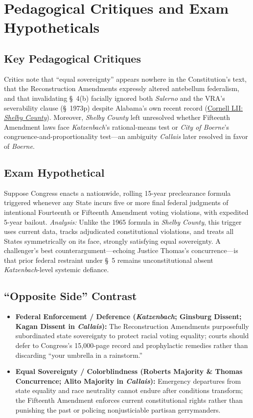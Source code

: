 \documentclass[12pt]{article}
\begin{document}
\section{Pedagogical Critiques and Exam Hypotheticals}

\subsection{Key Pedagogical Critiques}
Critics note that ``equal sovereignty'' appears nowhere in the Constitution's text, that the Reconstruction Amendments expressly altered antebellum federalism, and that invalidating \S~4(b) facially ignored both \emph{Salerno} and the VRA's severability clause (\S~1973p) despite Alabama's own recent record (\href{https://www.law.cornell.edu/supremecourt/text/12-96}{Cornell LII: \emph{Shelby County}}). Moreover, \emph{Shelby County} left unresolved whether Fifteenth Amendment laws face \emph{Katzenbach}'s rational-means test or \emph{City of Boerne}'s congruence-and-proportionality test---an ambiguity \emph{Callais} later resolved in favor of \emph{Boerne}.

\subsection{Exam Hypothetical}
Suppose Congress enacts a nationwide, rolling 15-year preclearance formula triggered whenever any State incurs five or more final federal judgments of intentional Fourteenth or Fifteenth Amendment voting violations, with expedited 5-year bailout. \emph{Analysis:} Unlike the 1965 formula in \emph{Shelby County}, this trigger uses current data, tracks adjudicated constitutional violations, and treats all States symmetrically on its face, strongly satisfying equal sovereignty. A challenger's best counterargument---echoing Justice Thomas's concurrence---is that prior federal restraint under \S~5 remains unconstitutional absent \emph{Katzenbach}-level systemic defiance.

\subsection{``Opposite Side'' Contrast}
\begin{itemize}
    \item \textbf{Federal Enforcement / Deference (\emph{Katzenbach}; Ginsburg Dissent; Kagan Dissent in \emph{Callais}):} The Reconstruction Amendments purposefully subordinated state sovereignty to protect racial voting equality; courts should defer to Congress's 15,000-page record and prophylactic remedies rather than discarding ``your umbrella in a rainstorm.''
    \item \textbf{Equal Sovereignty / Colorblindness (Roberts Majority \& Thomas Concurrence; Alito Majority in \emph{Callais}):} Emergency departures from state equality and race neutrality cannot endure after conditions transform; the Fifteenth Amendment enforces current constitutional rights rather than punishing the past or policing nonjusticiable partisan gerrymanders.
\end{itemize}
\end{document}
